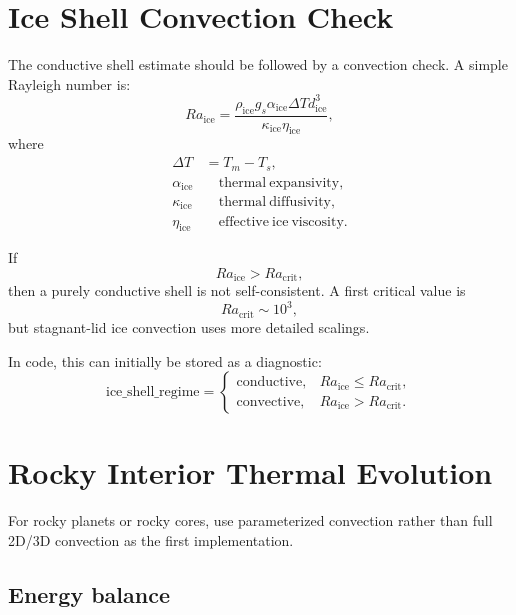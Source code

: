 \documentclass[11pt]{article}
\begin{document}
\section{Ice Shell Convection Check}

The conductive shell estimate should be followed by a convection check. A
simple Rayleigh number is:
\begin{equation}
    Ra_{\mathrm{ice}}
    =
    \frac{
        \rho_{\mathrm{ice}} g_s \alpha_{\mathrm{ice}}
        \Delta T d_{\mathrm{ice}}^3
    }{
        \kappa_{\mathrm{ice}} \eta_{\mathrm{ice}}
    },
\end{equation}
where
\begin{align}
    \Delta T &= T_m - T_s, \\
    \alpha_{\mathrm{ice}} &\quad \mathrm{thermal\ expansivity}, \\
    \kappa_{\mathrm{ice}} &\quad \mathrm{thermal\ diffusivity}, \\
    \eta_{\mathrm{ice}} &\quad \mathrm{effective\ ice\ viscosity}.
\end{align}

If
\begin{equation}
    Ra_{\mathrm{ice}} > Ra_{\mathrm{crit}},
\end{equation}
then a purely conductive shell is not self-consistent. A first critical value is
\begin{equation}
    Ra_{\mathrm{crit}} \sim 10^3,
\end{equation}
but stagnant-lid ice convection uses more detailed scalings.

In code, this can initially be stored as a diagnostic:
\begin{equation}
    \mathrm{ice\_shell\_regime}
    =
    \begin{cases}
    \mathrm{conductive}, & Ra_{\mathrm{ice}} \leq Ra_{\mathrm{crit}}, \\
    \mathrm{convective}, & Ra_{\mathrm{ice}} > Ra_{\mathrm{crit}}.
    \end{cases}
\end{equation}

\section{Rocky Interior Thermal Evolution}

For rocky planets or rocky cores, use parameterized convection rather than full
2D/3D convection as the first implementation.

\subsection{Energy balance}
\end{document}

